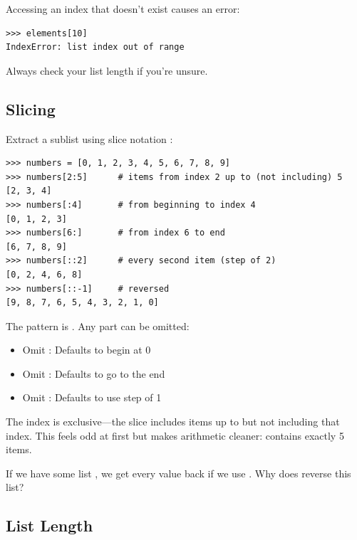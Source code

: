 \begin{warning}
Accessing an index that doesn't exist causes an error:
\begin{lstlisting}
>>> elements[10]
IndexError: list index out of range
\end{lstlisting}
Always check your list length if you're unsure.
\end{warning}

\subsection{Slicing}

Extract a sublist using slice notation :

\begin{lstlisting}
>>> numbers = [0, 1, 2, 3, 4, 5, 6, 7, 8, 9]
>>> numbers[2:5]      # items from index 2 up to (not including) 5
[2, 3, 4]
>>> numbers[:4]       # from beginning to index 4
[0, 1, 2, 3]
>>> numbers[6:]       # from index 6 to end
[6, 7, 8, 9]
>>> numbers[::2]      # every second item (step of 2)
[0, 2, 4, 6, 8]
>>> numbers[::-1]     # reversed
[9, 8, 7, 6, 5, 4, 3, 2, 1, 0]
\end{lstlisting}

The pattern is . Any part can be omitted:
\begin{itemize}
    \item Omit : Defaults to begin at 0
    \item Omit : Defaults to go to the end
    \item Omit : Defaults to use step of 1
\end{itemize}

\begin{note}
The  index is exclusive---the slice includes items up to but not including that index. This feels odd at first but makes arithmetic cleaner:  contains exactly 5 items.
\end{note}

\begin{ponder}
If we have some list , we get every value back if we use . Why does  reverse this list?
\end{ponder}

\subsection{List Length}

